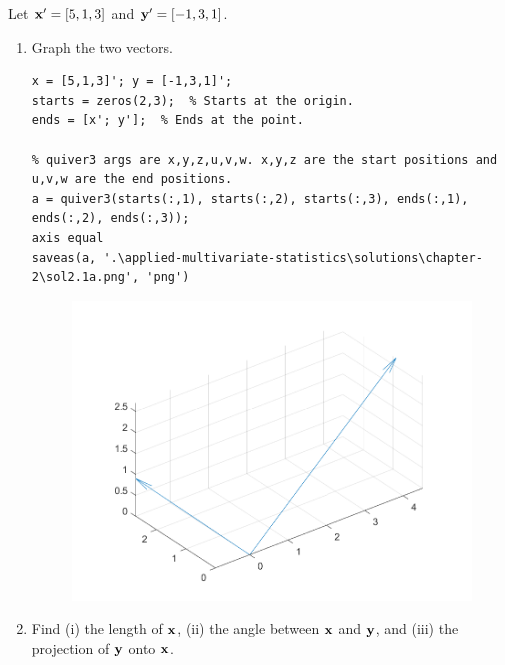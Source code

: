 Let $\bold{x}^\prime = [5,1,3]$ and $\bold{y}^\prime = [-1,3,1]$.

        \begin{enumerate}[label=(\alph*)]
            \item Graph the two vectors.
            
            \begin{lstlisting}
x = [5,1,3]'; y = [-1,3,1]';
starts = zeros(2,3);  % Starts at the origin.
ends = [x'; y'];  % Ends at the point.

% quiver3 args are x,y,z,u,v,w. x,y,z are the start positions and u,v,w are the end positions.
a = quiver3(starts(:,1), starts(:,2), starts(:,3), ends(:,1), ends(:,2), ends(:,3));
axis equal
saveas(a, '.\applied-multivariate-statistics\solutions\chapter-2\sol2.1a.png', 'png')
            \end{lstlisting}

            \begin{figure}[H]
                \centering
                \includegraphics[scale=0.5]{./matlab/chapter-2/sol2.1a.png}
            \end{figure}
            

            \item Find (i) the length of $\bold{x}$, (ii) the angle between $\bold{x}$ and $\bold{y}$, and (iii) the projection of $\bold{y}$ onto $\bold{x}$.
            

\end{enumerate}
